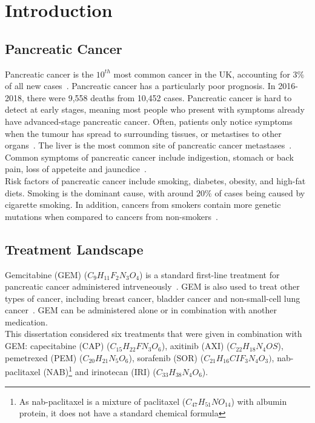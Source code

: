 \chapter{Introduction}

\section{Pancreatic Cancer}
Pancreatic cancer is the $10^{th}$ most common cancer in the UK, accounting for $3\%$ of all new cases~\cite{pancStat}. Pancreatic cancer has a particularly poor prognosis. In 2016-2018, there were 9,558 deaths from 10,452 cases. Pancreatic cancer is hard to detect at early stages, meaning most people who present with symptoms already have advanced-stage pancreatic cancer. Often, patients only notice symptoms when the tumour has spread to surrounding tissues, or metastises to other organs~\cite{kelsen}. The liver is the most common site of pancreatic cancer metastases~\cite{deeb}. Common symptoms of pancreatic cancer include indigestion, stomach or back pain, loss of appeteite and jauncdice~\cite{pancSymp}. \\

Risk factors of pancreatic cancer include smoking, diabetes, obesity, and high-fat diets. Smoking is the dominant cause, with around $20\%$ of cases being caused by cigarette smoking. In addition, cancers from smokers contain more genetic mutations when compared to cancers from non-smokers~\cite{blackford}. 

\section{Treatment Landscape}
Gemcitabine (GEM) ($C_9H_{11}F_2N_3O_4$) is a standard first-line treatment for pancreatic cancer administered intrveneously~\cite{NG85}. GEM is also used to treat other types of cancer, including breast cancer, bladder cancer and non-small-cell lung cancer~\cite{wong2009}. GEM can be administered alone or in combination with another medication.\\

This dissertation considered six treatments that were given in combination with GEM: capecitabine (CAP) ($C_{15}H_{22}FN_3O_6$), axitinib (AXI) ($C_{22}H_{18}N_4OS$), pemetrexed (PEM) ($C_{20}H_{21}N_5O_6$), sorafenib (SOR) ($C_{21}H_{16}CIF_{3}N_4O_3)$, nab-paclitaxel (NAB)\footnote{As nab-paclitaxel is a mixture of paclitaxel ($C_{47}H_{51}NO_{14}$) with albumin protein, it does not have a standard chemical formula} and irinotecan (IRI) ($C_{33}H_{38}N_4O_6$). \\

